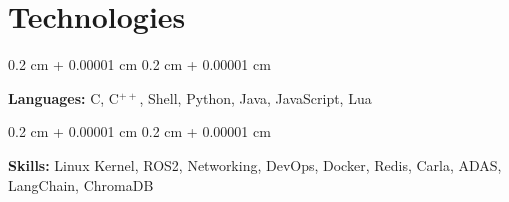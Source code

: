 \documentclass[10pt, letterpaper]{article}
\newenvironment{onecolentry}{
    \begin{adjustwidth}{
        0.2 cm + 0.00001 cm
    }{
        0.2 cm + 0.00001 cm
    }
}{
    \end{adjustwidth}
} %
\begin{document}
    
    \section{Technologies}



        
        \begin{onecolentry}
            \textbf{Languages:} C, C$^{++}$, Shell, Python, Java, JavaScript, Lua
        \end{onecolentry}

        \vspace{0.1 cm}

        \begin{onecolentry}
            \textbf{Skills:} Linux Kernel, ROS2, Networking, DevOps, Docker, Redis, Carla, ADAS, LangChain, ChromaDB
        \end{onecolentry}


    
\end{document}
